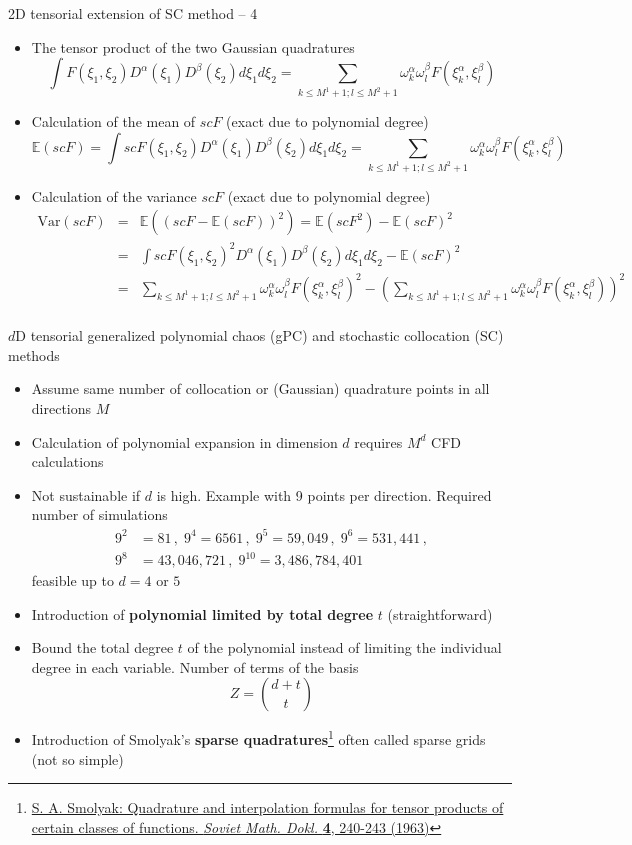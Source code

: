 \documentclass[10pt]{beamer}
\def\vo{\vspace{1mm}}
\def\vt{\vspace{2mm}}
\def\begit{\begin{itemize}}
\def\endit{\end{itemize}}
\def\beas{\begin{eqnarray*}}
\def\eeas{\end{eqnarray*}}
\newcommand{\esp}{{\mathbb E}}
\newcommand{\Var}{\text{Var}}
\begin{document}
%
\begin{frame}{2D tensorial extension of SC method -- 4}
%
\footnotesize{
%
\begit
%
\item The tensor product of the two Gaussian quadratures  
%
    $$ \int  F(\xi_1,\xi_2) D^\alpha(\xi_1) D^\beta(\xi_2) d\xi_1 d\xi_2 = \sum_{k \leq M^1+1 ; l\leq M^2+1} \omega^\alpha_k \omega^\beta_l F(\xi^\alpha_k,\xi^\beta_l) $$
%
\item Calculation of the mean of $scF$ (exact due to polynomial degree) 
   $$  \esp(scF) = \int  scF(\xi_1,\xi_2) D^\alpha(\xi_1) D^\beta(\xi_2) d\xi_1 d\xi_2 =  \sum_{k \leq M^1+1 ; l\leq M^2+1} \omega^\alpha_k \omega^\beta_l F(\xi^\alpha_k,\xi^\beta_l)   $$
%
\item Calculation of the variance  $scF$ (exact due to polynomial degree)
%
 \beas
  \Var(scF) &=&  \esp((scF-\esp(scF))^2) = \esp(scF^2)-\esp(scF)^2 \\ 
         &=&  \int  scF(\xi_1,\xi_2)^2 D^\alpha(\xi_1) D^\beta(\xi_2) d\xi_1 d\xi_2 - \esp(scF)^2  \\
        &=&   \sum_{k \leq M^1+1 ; l\leq M^2+1} \omega^\alpha_k \omega^\beta_l F(\xi^\alpha_k,\xi^\beta_l)^2  -
                                       \left( \sum_{k \leq M^1+1 ; l\leq M^2+1} \omega^\alpha_k \omega^\beta_l F(\xi^\alpha_k,\xi^\beta_l)\right)^2 \\
  \eeas
%
\endit
%
}
%
\end{frame}
%
%
\begin{frame}{$d$D tensorial generalized polynomial chaos (gPC) and stochastic collocation (SC) methods }
%
\footnotesize{
%
\begit
%
\item Assume same number of collocation or (Gaussian) quadrature points in all directions $M$
\vt
\item Calculation of polynomial expansion in dimension $d$ requires  $M^d$ CFD calculations
\vt
\item Not sustainable if $d$ is high.  Example with 9 points per direction. Required number of simulations
%
\begin{displaymath}
\begin{split}
 9^2 &= 81\,,\;9^4 = 6561\,,\;9^5=59,049\,,\;9^{6}= 531,441\,, \\
 9^{8} &= 43,046,721\,,\;9^{10}= 3,486,784,401
\end{split}
\end{displaymath}
feasible up to $d=4$ or $5$
%
\item Introduction of {\bf polynomial limited by total degree} $t$ (straightforward)
\item[] Bound the total degree $t$ of the polynomial instead of limiting the individual degree in each variable. Number of 
terms of the basis 
 $$ Z = \binom{d+t}{t} $$
\vo
\item Introduction of Smolyak's {\bf sparse quadratures}\footnote{\href{http://mi.mathnet.ru/eng/dan/v148/i5/p1042}{\scriptsize{S. A. Smolyak: Quadrature and interpolation formulas for tensor products of certain classes of functions. {\sl Soviet Math. Dokl.} {\bf 4}, 240-243 (1963)}}} often called sparse grids (not so simple)
%
\endit
%
}
%
\end{frame}
\end{document}
